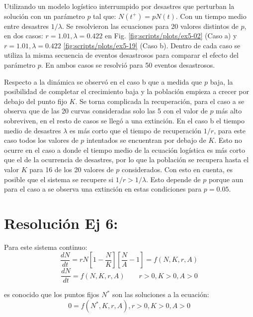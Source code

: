\documentclass[twocolumn,aps,prl]{revtex4-1}
\begin{document}
Utilizando un modelo logístico interrumpido por desastres que perturban la solución con un parámetro $p$ tal que: $N(t^+)=pN(t)$. Con un tiempo medio entre desastres $1/\lambda$. Se resolvieron las ecuaciones para 20 valores distintos de $p$, en dos casos: $r = \text{1.01}, \lambda = \text{0.422}$ en Fig. \ref{fig:scripts/plots/ex5-02} (Caso a) y $r = \text{1.01}, \lambda = \text{0.422}$ \ref{fig:scripts/plots/ex5-19} (Caso b). Dentro de cada caso se utiliza la misma secuencia de eventos desastrosos para comparar el efecto del parámetro $p$. En ambos casos se resolvió para 50 eventos desastrosos. 

Respecto a la dinámica se observó en el caso b que a medida que $p$ baja, la posibilidad de completar el crecimiento baja y la población empieza a crecer por debajo del punto fijo $K$. Se torna complicada la recuperación, para el caso a se observa que de las 20 curvas consideradas solo las 5 con el valor de $p$ más alto sobreviven, en el resto de casos se llegó a una extinción. 
En el caso b el tiempo medio de desastres $\lambda$ es más corto que el tiempo de recuperación $1/r$, para este caso todos los valores de $p$ intentados se encuentran por debajo de $K$. Esto no ocurre en el caso a donde el tiempo medio de la ecuación logística es más corto que el de la ocurrencia de desastres, por lo que la población se recupera hasta el valor $K$ para 16 de los 20 valores de $p$ considerados. Con esto en cuenta, es posible que el sistema se recupere si $1/r > 1/\lambda$. Esto depende de $p$ porque aun para el caso a se observa una extinción en estas condiciones para $p =\text{0.05}$.

% 
%                              
% 

\section{Resolución Ej 6:}

Para este sistema continuo:
\begin{equation}\label{eqn:Alle}
\frac{d N}{d t} =r N\left[1-\frac{N}{K}\right]\left[\frac{N}{A}-1\right] = f(N, K, r, A)
\end{equation}
$$
\frac{d N}{d t} = f(N, K, r, A) \qquad r>0, K>0 , A>0
$$

es conocido que los puntos fijos $N^*$ son las soluciones a la ecuación:
\begin{equation}\label{eqn:etiqueta3}
    0 = f(N^*, K, r, A), r>0, K>0, A >0
\end{equation}
\end{document}
